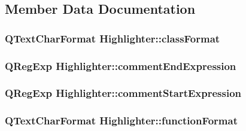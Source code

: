 \subsection{Member Data Documentation}
\hypertarget{class_highlighter_a765a13081aa25d818c766b7f8e50f454}{
\subsubsection[{class\-Format}]{\setlength{\rightskip}{0pt plus 5cm}Q\-Text\-Char\-Format Highlighter\-::class\-Format\hspace{0.3cm}{\ttfamily [private]}}}\label{class_highlighter_a765a13081aa25d818c766b7f8e50f454}
\hypertarget{class_highlighter_a3baa1033bbdf70a16df42940968b72b4}{
\subsubsection[{comment\-End\-Expression}]{\setlength{\rightskip}{0pt plus 5cm}Q\-Reg\-Exp Highlighter\-::comment\-End\-Expression\hspace{0.3cm}{\ttfamily [private]}}}\label{class_highlighter_a3baa1033bbdf70a16df42940968b72b4}
\hypertarget{class_highlighter_a67cdecd667929b4eefbc7057d58cd90b}{
\subsubsection[{comment\-Start\-Expression}]{\setlength{\rightskip}{0pt plus 5cm}Q\-Reg\-Exp Highlighter\-::comment\-Start\-Expression\hspace{0.3cm}{\ttfamily [private]}}}\label{class_highlighter_a67cdecd667929b4eefbc7057d58cd90b}
\hypertarget{class_highlighter_a7e02cd8caee678c1256998c88d30e241}{
\subsubsection[{function\-Format}]{\setlength{\rightskip}{0pt plus 5cm}Q\-Text\-Char\-Format Highlighter\-::function\-Format\hspace{0.3cm}{\ttfamily [private]}}}\label{class_highlighter_a7e02cd8caee678c1256998c88d30e241}
